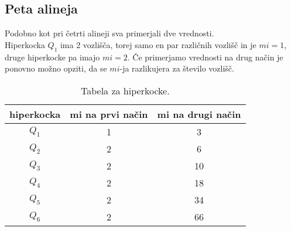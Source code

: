 \documentclass[a4paper]{article}
\begin{document}
\subsection{Peta alineja}
Podobno kot pri četrti alineji sva primerjali dve vrednosti.\\
Hiperkocka $Q_1$ ima 2 vozlišča, torej samo en par različnih vozlišč in je $mi=1$, druge hiperkocke pa imajo $mi=2$.
Če primerjamo vrednosti na drug način je ponovno možno opziti, da se $mi$-ja razlikujera za število vozlišč.
\begin{table}[t!]
\centering
\begin{tabular}{||c  c c||} 
 \hline
 hiperkocka & mi na prvi način & mi na drugi način \\ [0.5ex] 
 \hline\hline
 $Q_{1}$ & 1 & 3 \\ 
 $Q_{2}$ & 2 & 6 \\
 $Q_{3}$ & 2 & 10 \\
 $Q_{4}$ & 2 & 18 \\
 $Q_{5}$ & 2 & 34 \\
 $Q_{6}$ & 2 & 66 \\ 
 \hline
\end{tabular}
\caption{Tabela za hiperkocke.}
\label{table:2}
\end{table}
\end{document}
